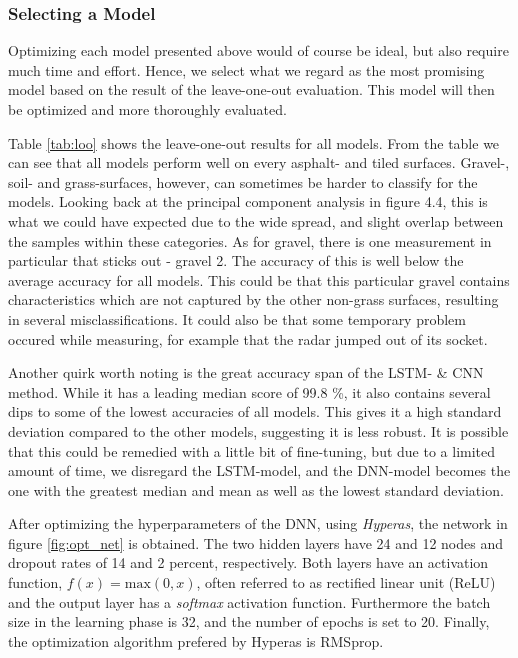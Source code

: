 \subsubsection{Selecting a Model}
Optimizing each model presented above would of course be ideal, but also require much time and effort. Hence, we select what we regard as the most promising model based on the result of the leave-one-out evaluation. This model will then be optimized and more thoroughly evaluated.

Table \ref{tab:loo} shows the leave-one-out results for all models. From the table we can see that all models perform well on every asphalt- and tiled surfaces. Gravel-, soil- and grass-surfaces, however, can sometimes be harder to classify for the models. Looking back at the principal component analysis in figure 4.4, this is what we could have expected due to the wide spread, and slight overlap between the samples within these categories. As for gravel, there is one measurement in particular that sticks out - gravel 2. The accuracy of this is well below the average accuracy for all models. This could be that this particular gravel contains characteristics which are not captured by the other non-grass surfaces, resulting in several misclassifications. It could also be that some temporary problem occured while measuring, for example that the radar jumped out of its socket.

Another quirk worth noting is the great accuracy span of the LSTM- \& CNN method. While it has a leading median score of 99.8 \%, it also contains several dips to some of the lowest accuracies of all models. This gives it a high standard deviation compared to the other models, suggesting it is less robust. It is possible that this could be remedied with a little bit of fine-tuning, but due to a limited amount of time, we disregard the LSTM-model, and the DNN-model becomes the one with the greatest median and mean as well as the lowest standard deviation. 

After optimizing the hyperparameters of the DNN, using \textit{Hyperas}, the network in figure \ref{fig:opt_net} is obtained. The two hidden layers have 24 and 12 nodes and dropout rates of 14 and 2 percent, respectively. Both layers have an activation function, $f(x)=\textrm{max}(0,x)$, often referred to as rectified linear unit (ReLU) and the output layer has a \textit{softmax} activation function. Furthermore the batch size in the learning phase is 32, and the number of epochs is set to 20. Finally, the optimization algorithm prefered by Hyperas is RMSprop.

